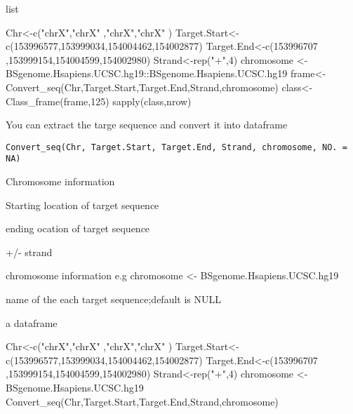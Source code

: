 \documentclass[a4paper]{book}
\begin{document}
%
\begin{Value}
list
\end{Value}
%
\begin{Examples}
\begin{ExampleCode}
Chr<-c("chrX","chrX" ,"chrX","chrX" )
Target.Start<-c(153996577,153999034,154004462,154002877)
Target.End<-c(153996707 ,153999154,154004599,154002980)
Strand<-rep("+",4)
chromosome <- BSgenome.Hsapiens.UCSC.hg19::BSgenome.Hsapiens.UCSC.hg19
frame<-Convert_seq(Chr,Target.Start,Target.End,Strand,chromosome)
class<-Class_frame(frame,125)
sapply(class,nrow)
\end{ExampleCode}
\end{Examples}
%
\begin{Description}\relax
You can extract the targe sequence and convert it into dataframe
\end{Description}
%
\begin{Usage}
\begin{verbatim}
Convert_seq(Chr, Target.Start, Target.End, Strand, chromosome, NO. = NA)
\end{verbatim}
\end{Usage}
%
\begin{Arguments}
\begin{ldescription}
\item[\code{Chr}] Chromosome information

\item[\code{Target.Start}] Starting location of target sequence

\item[\code{Target.End}] ending ocation of target sequence

\item[\code{Strand}] +/- strand

\item[\code{chromosome}] chromosome information
e.g chromosome <- BSgenome.Hsapiens.UCSC.hg19

\item[\code{NO.}] name of the each target sequence;default is NULL
\end{ldescription}
\end{Arguments}
%
\begin{Value}
a dataframe
\end{Value}
%
\begin{Examples}
\begin{ExampleCode}
Chr<-c("chrX","chrX" ,"chrX","chrX" )
Target.Start<-c(153996577,153999034,154004462,154002877)
Target.End<-c(153996707 ,153999154,154004599,154002980)
Strand<-rep("+",4)
chromosome <- BSgenome.Hsapiens.UCSC.hg19
Convert_seq(Chr,Target.Start,Target.End,Strand,chromosome)

\end{ExampleCode}
\end{Examples}
\end{document}
